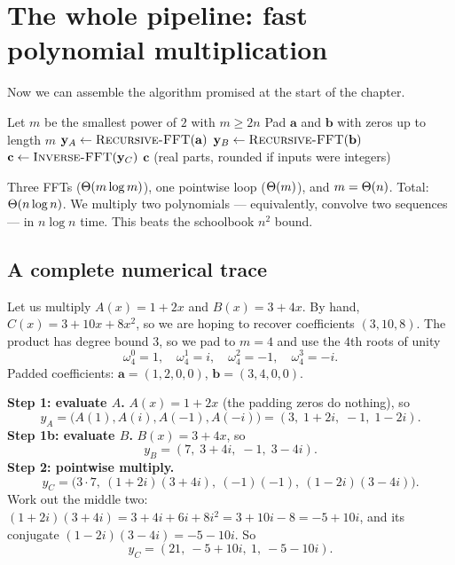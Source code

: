 \section{The whole pipeline: fast polynomial multiplication}

Now we can assemble the algorithm promised at the start of the chapter.

\begin{algorithm}[H]
\caption{\textsc{Poly-Multiply}$(\mathbf{a},\mathbf{b})$}
Let $m$ be the smallest power of $2$ with $m \ge 2n$\;
Pad $\mathbf{a}$ and $\mathbf{b}$ with zeros up to length $m$\;
$\mathbf{y}_A \gets \textsc{Recursive-FFT}(\mathbf{a})$
$\mathbf{y}_B \gets \textsc{Recursive-FFT}(\mathbf{b})$
$\mathbf{c} \gets \textsc{Inverse-FFT}(\mathbf{y}_C)$
\Return $\mathbf{c}$ (real parts, rounded if inputs were integers)\;
\end{algorithm}

\begin{focusbox}
Three FFTs ($\Theta(m\log m)$), one pointwise loop ($\Theta(m)$), and $m = \Theta(n)$.
Total: $\Theta(n\log n)$. We multiply two polynomials --- equivalently, convolve two
sequences --- in $n\log n$ time. This beats the schoolbook $n^2$ bound.
\end{focusbox}

\subsection{A complete numerical trace}\label{ch29:lab}

Let us multiply $A(x) = 1 + 2x$ and $B(x) = 3 + 4x$. By hand,
$C(x) = 3 + 10x + 8x^2$, so we are hoping to recover coefficients $(3,10,8)$. The
product has degree bound $3$, so we pad to $m=4$ and use the $4$th roots of unity
\[
\omega_4^0 = 1,\quad \omega_4^1 = i,\quad \omega_4^2 = -1,\quad \omega_4^3 = -i.
\]
Padded coefficients: $\mathbf{a}=(1,2,0,0)$, $\mathbf{b}=(3,4,0,0)$.

\textbf{Step 1: evaluate $A$.} $A(x) = 1 + 2x$ (the padding zeros do nothing), so
\[
y_A = \big(A(1),A(i),A(-1),A(-i)\big) = (3,\; 1+2i,\; -1,\; 1-2i).
\]
\textbf{Step 1b: evaluate $B$.} $B(x)=3+4x$, so
\[
y_B = (7,\; 3+4i,\; -1,\; 3-4i).
\]
\textbf{Step 2: pointwise multiply.}
\[
y_C = \big(3\cdot 7,\ (1+2i)(3+4i),\ (-1)(-1),\ (1-2i)(3-4i)\big).
\]
Work out the middle two: $(1+2i)(3+4i) = 3 + 4i + 6i + 8i^2 = 3 + 10i - 8 = -5 + 10i$,
and its conjugate $(1-2i)(3-4i) = -5 - 10i$. So
\[
y_C = (21,\ -5+10i,\ 1,\ -5-10i).
\]

